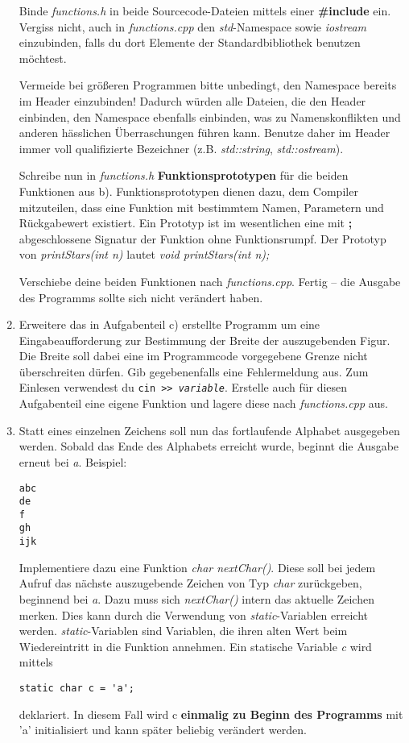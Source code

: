 \begin{enumerate}
Binde \emph{functions.h} in beide Sourcecode-Dateien mittels 
einer \textbf{\#include} ein.
Vergiss nicht, auch in \emph{functions.cpp} den \emph{std}-Namespace sowie \emph{iostream} einzubinden, falls du dort Elemente der Standardbibliothek benutzen möchtest.

Vermeide bei größeren Programmen bitte unbedingt, den Namespace bereits im Header einzubinden!
Dadurch würden alle Dateien, die den Header einbinden, den Namespace ebenfalls einbinden, was zu Namenskonflikten und anderen hässlichen Überraschungen führen kann.
Benutze daher im Header immer voll qualifizierte Bezeichner (z.B. \emph{std::string}, \emph{std::ostream}).

Schreibe nun in \emph{functions.h} \textbf{Funktionsprototypen} für die beiden Funktionen aus b).
Funktionsprototypen dienen dazu, dem Compiler mitzuteilen, dass eine Funktion mit bestimmtem Namen, Parametern und Rückgabewert existiert.
Ein Prototyp ist im wesentlichen eine mit \textbf{;} abgeschlossene Signatur der Funktion ohne Funktionsrumpf.
Der Prototyp von \emph{printStars(int n)} lautet \emph{void printStars(int n);}

Verschiebe deine beiden Funktionen nach \emph{functions.cpp}.
Fertig -- die Ausgabe des Programms sollte sich nicht verändert haben.

\item
Erweitere das in Aufgabenteil c) erstellte Programm um eine Eingabeaufforderung zur Bestimmung der Breite der auszugebenden Figur.
Die Breite soll dabei eine im Programmcode vorgegebene Grenze nicht überschreiten dürfen.
Gib gegebenenfalls eine Fehlermeldung aus.
Zum Einlesen verwendest du \texttt{cin >{}> \emph{variable}}.
Erstelle auch für diesen Aufgabenteil eine eigene Funktion und lagere diese nach \emph{functions.cpp} aus.

\item Statt eines einzelnen Zeichens soll nun das fortlaufende Alphabet ausgegeben werden.
Sobald das Ende des Alphabets erreicht wurde, beginnt die Ausgabe erneut bei \emph{a}. Beispiel:
\begin{lstlisting}
abc
de
f
gh
ijk
\end{lstlisting}

Implementiere dazu eine Funktion \emph{char nextChar()}.
Diese soll bei jedem Aufruf das nächste auszugebende Zeichen von Typ \emph{char} zurückgeben, beginnend bei \emph{\textquotesingle a\textquotesingle}.
Dazu muss sich \emph{nextChar()} intern das aktuelle Zeichen merken.
Dies kann durch die Verwendung von \emph{static}-Variablen erreicht werden. \emph{static}-Variablen sind Variablen, die ihren alten Wert beim Wiedereintritt in die Funktion annehmen.
Ein statische Variable \emph{c} wird mittels 
\begin{lstlisting}
static char c = 'a';
\end{lstlisting}
deklariert.
In diesem Fall wird c \textbf{einmalig zu Beginn des Programms} mit 'a' initialisiert und kann später beliebig verändert werden.
\end{enumerate} 


